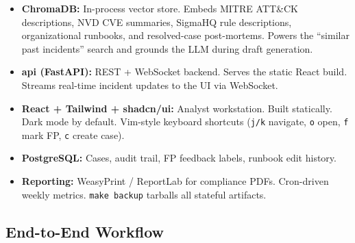 \documentclass[11pt,a4paper]{article}
\begin{document}
\begin{itemize}[leftmargin=*, itemsep=2pt]
  \item \textbf{ChromaDB:} In-process vector store. Embeds MITRE ATT\&CK descriptions, NVD CVE summaries, SigmaHQ rule descriptions, organizational runbooks, and resolved-case post-mortems. Powers the ``similar past incidents'' search and grounds the LLM during draft generation.
  \item \textbf{api (FastAPI):} REST + WebSocket backend. Serves the static React build. Streams real-time incident updates to the UI via WebSocket.
  \item \textbf{React + Tailwind + shadcn/ui:} Analyst workstation. Built statically. Dark mode by default. Vim-style keyboard shortcuts (\texttt{j/k} navigate, \texttt{o} open, \texttt{f} mark FP, \texttt{c} create case).
  \item \textbf{PostgreSQL:} Cases, audit trail, FP feedback labels, runbook edit history.
  \item \textbf{Reporting:} WeasyPrint / ReportLab for compliance PDFs. Cron-driven weekly metrics. \texttt{make backup} tarballs all stateful artifacts.
\end{itemize}

\subsection{End-to-End Workflow}
\end{document}
